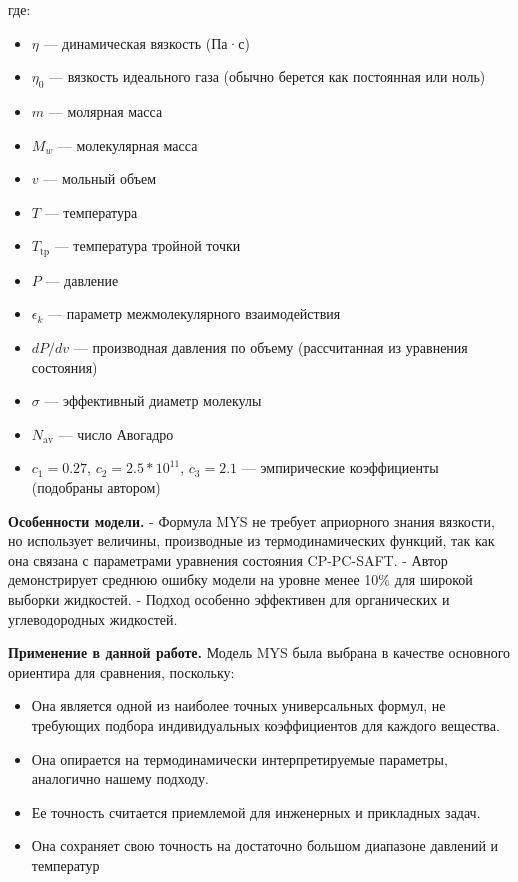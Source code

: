 \documentclass[a4paper,12pt]{article}
\begin{document}
      где:  
      \begin{itemize}
        \item $\eta$ — динамическая вязкость (Па·с)
        \item $\eta_0$ — вязкость идеального газа (обычно берется как постоянная или ноль)
        \item $m$ — молярная масса
        \item $M_w$ — молекулярная масса
        \item $v$ — мольный объем
        \item $T$ — температура
        \item $T_{\text{tp}}$ — температура тройной точки
        \item $P$ — давление
        \item $\epsilon_k$ — параметр межмолекулярного взаимодействия
        \item $dP/dv$ — производная давления по объему (рассчитанная из уравнения состояния)
        \item $\sigma$ — эффективный диаметр молекулы
        \item $N_{\text{av}}$ — число Авогадро
        \item $c_1=0.27$, $c_2=2.5*10^{11}$, $c_3=2.1$ — эмпирические коэффициенты (подобраны автором)
      \end{itemize}
      
      \textbf{Особенности модели.}  
      - Формула MYS не требует априорного знания вязкости, но использует величины, производные из термодинамических функций, так как она связана с параметрами уравнения состояния CP-PC-SAFT.
      - Автор демонстрирует среднюю ошибку модели на уровне менее 10\% для широкой выборки жидкостей.
      - Подход особенно эффективен для органических и углеводородных жидкостей.
      
      \textbf{Применение в данной работе.}  
      Модель MYS была выбрана в качестве основного ориентира для сравнения, поскольку:
      \begin{itemize}
        \item Она является одной из наиболее точных универсальных формул, не требующих подбора индивидуальных коэффициентов для каждого вещества.
        \item Она опирается на термодинамически интерпретируемые параметры, аналогично нашему подходу.
        \item Ее точность считается приемлемой для инженерных и прикладных задач.
        \item Она сохраняет свою точность на достаточно большом диапазоне давлений и температур
      \end{itemize}
      
\end{document}

